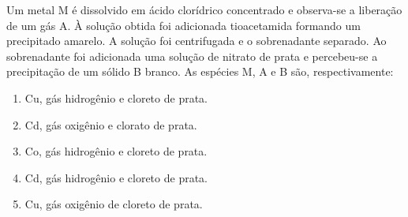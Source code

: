Um metal M é dissolvido em ácido clorídrico concentrado e observa-se a liberação de um gás A. À solução
obtida foi adicionada tioacetamida formando um precipitado amarelo. A solução foi centrifugada e o
sobrenadante separado. Ao sobrenadante foi adicionada uma solução de nitrato de prata e percebeu-se a
precipitação de um sólido B branco. As espécies M, A e B são, respectivamente:


\begin{enumerate}[label = (\alph*)]
	\item Cu, gás hidrogênio e cloreto de prata.
	\item Cd, gás oxigênio e clorato de prata.
	\item Co, gás hidrogênio e cloreto de prata.
	\item Cd, gás hidrogênio e cloreto de prata.
	\item Cu, gás oxigênio de cloreto de prata.
\end{enumerate}
